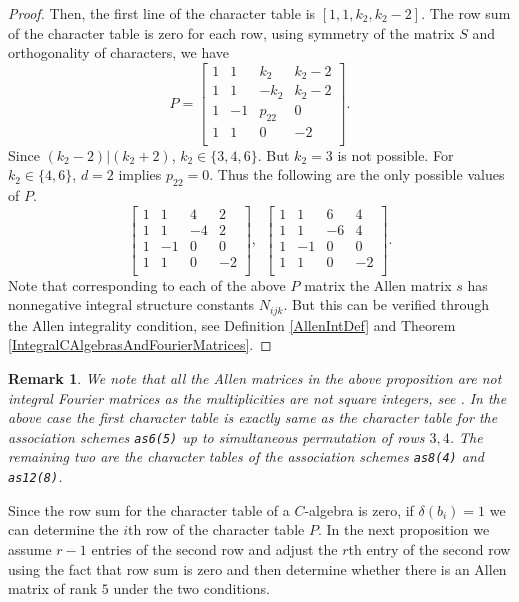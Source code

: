 \documentclass[12pt]{amsart}
\newtheorem{remark}[thm]{Remark}
\begin{document}
\begin{proof}
Then, the first line of the character table is $[1,1,k_2,k_2-2]$.
The row sum of the character table is zero for each row, using symmetry of the matrix $S$ and orthogonality of characters, we have
$$P=\left[
   \begin{array}{cccc}
      1 & 1 & k_2 &k_2-2\\
     1 & 1 &    -k_2 &  k_2-2\\
      1 & -1 &  p_{22}&  0\\
         1 & 1 & 0&  -2\\
   \end{array}
 \right].$$
Since $(k_2-2)\big|(k_2+2)$, $k_2\in\{3,4,6\}$.  But $k_2=3$ is not possible. For $k_2\in\{4,6\}$, $d=2$ implies $p_{22}=0$. Thus the following are the only possible values of $P$.
$$\left[
   \begin{array}{cccc}
      1 & 1 & 4 &2\\
     1 & 1 &    -4 &  2\\
      1 & -1 &  0&  0\\
         1 & 1 & 0&  -2\\
   \end{array}
 \right],~~\left[
   \begin{array}{cccc}
      1 & 1 & 6 &4\\
     1 & 1 &    -6 &  4\\
      1 & -1 &  0&  0\\
         1 & 1 & 0&  -2\\
   \end{array}
 \right].$$
Note that corresponding to each of the above $P$ matrix the Allen matrix $s$ has nonnegative integral structure constants $N_{ijk}$. But this can be   verified through the Allen integrality condition, see Definition \ref{AllenIntDef} and Theorem \ref{IntegralCAlgebrasAndFourierMatrices}.
\end{proof}

\begin{remark} We note that all the Allen matrices in the above proposition are not integral Fourier matrices as the multiplicities are not square integers, see \cite[Lemma 12]{G1}. In the above case the first character table is exactly same as the character table for the association schemes {\tt as6(5)}  up to simultaneous permutation of rows $3,4$. The remaining two are the character tables of the association schemes {\tt as8(4)} and {\tt as12(8)}.
\end{remark}

Since the row sum for the character table of a $C$-algebra is zero, if $\delta(b_i)=1$ we can determine the $i$th row of the character table $P$. In the next proposition we assume $r-1$ entries of the second row and adjust the $r$th entry of the second row using the fact that row sum is zero and then determine whether there is an Allen matrix of rank $5$ under the two conditions.
\end{document}

